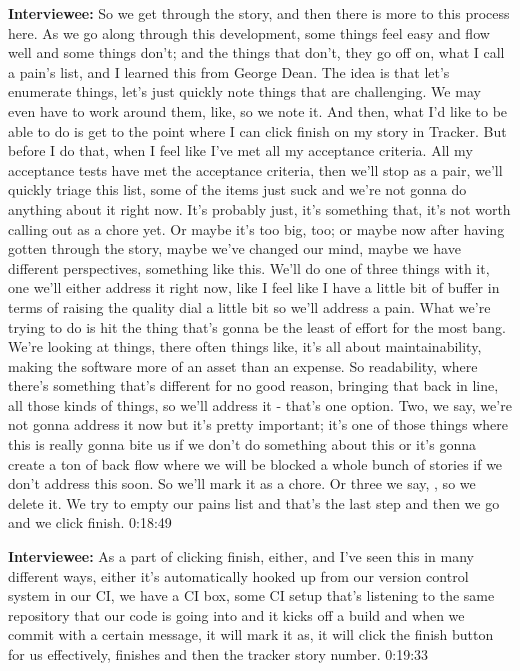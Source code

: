 \textbf{Interviewee:}  	So we get through the story, and then there is more to this process here.  As we go along through this development, some things feel easy and flow well and some things don't; and the things that don't, they go off on, what I call a pain's list, and I learned this from George Dean.  The idea is that let's enumerate things, let's just quickly note things that are challenging.  We may even have to work around them, like,  so we note it.  And then, what I'd like to be able to do is get to the point where I can click finish on my story in Tracker.  But before I do that, when I feel like I've met all my acceptance criteria.  All my acceptance tests have met the acceptance criteria, then we'll stop as a pair, we'll quickly triage this list, some of the items just suck and we're not gonna do anything about it right now.  It's probably just, it's something that, it's not worth calling out as a chore yet. Or maybe it's too big, too; or maybe now after having gotten through the story, maybe we've changed our mind, maybe we have different perspectives, something like this.  We'll do one of three things with it, one we'll either address it right now, like   I feel like I have a little bit of buffer in terms of raising the quality dial a little bit so we'll address a pain.  What we're trying to do is hit the thing that's gonna be the least of effort for the most bang. We're looking at things, there often things like, it's all about maintainability, making the software more of an asset than an expense.  So readability, where there's something that's different for no good reason, bringing that back in line, all those kinds of things, so we'll address it - that's one option.  Two, we say, we're not gonna address it now but it's pretty important; it's one of those things where this is really gonna bite us if we don't do something about this or it's gonna create a ton of back flow where we will be blocked a whole bunch of stories if we don't address this soon.  So we'll mark it as a chore.  Or three we say, , so we delete it.  We try to empty our pains list and that's the last step and then we go and we click finish.   0:18:49

\textbf{Interviewee:}   As a part of clicking finish, either, and I've seen this in many different ways, either it's automatically hooked up from our version control system in our CI, we have a CI box, some CI setup that's listening to the same repository that our code is going into and it kicks off a build and when we commit with a certain message, it will mark it as, it will click the finish button for us effectively, finishes and then the tracker story number.  0:19:33

